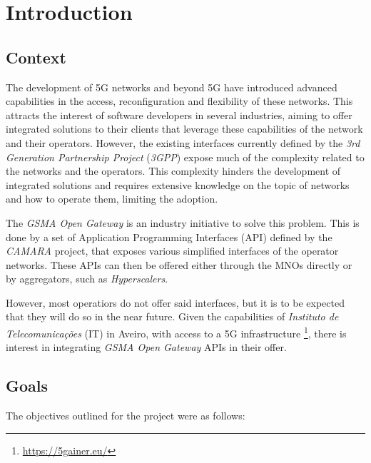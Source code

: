\chapter{Introduction}

\section{Context}

The development of 5G networks and beyond 5G have introduced
advanced capabilities in the access, reconfiguration and
flexibility of these networks. This attracts the interest of
software developers in several industries, aiming to offer
integrated solutions to their clients that leverage these
capabilities of the network and their operators. However, the
existing interfaces currently defined by the \emph{3rd Generation
Partnership Project} (\emph{3GPP}) expose much of the complexity
related to the networks and the operators. This complexity
hinders the development of integrated solutions and requires
extensive knowledge on the topic of networks and how to operate
them, limiting the adoption.

The \emph{GSMA Open Gateway} is an industry initiative to solve
this problem. This is done by a set of Application Programming
Interfaces (API) defined by the \emph{CAMARA} project, that
exposes various simplified interfaces of the operator networks.
These APIs can then be offered either through the MNOs directly
or by aggregators, such as \emph{Hyperscalers}.

However, most operatiors do not offer said interfaces, but it is
to be expected that they will do so in the near future. Given the
capabilities of \emph{Instituto de Telecomunicações} (IT) in
Aveiro, with access to a 5G infrastructure
\footnote{\url{https://5gainer.eu/}}\cite{ieee:5GAIner}, there is 
interest in integrating \emph{GSMA Open Gateway} APIs in their
offer.

\section{Goals}

The objectives outlined for the project were as follows:

